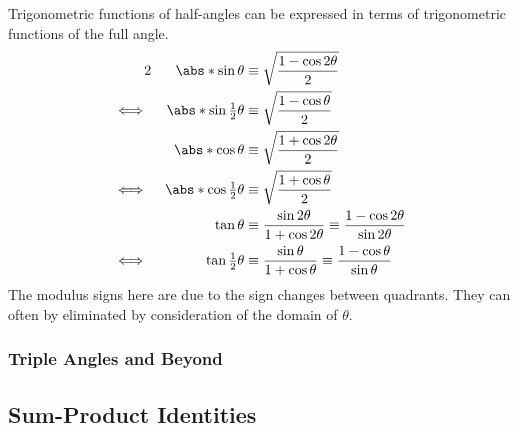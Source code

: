 \begin{theorem} \label{thm_trig_half_angle}
 Trigonometric functions of half-angles can be expressed in terms of
 trigonometric functions of the full angle.
 \begin{alignat*}2
  &&\abs*{\sin \theta} &\equiv
      \sqrt{\frac{1 - \cos 2 \theta} 2} \\
  \iff{}&& \abs*{\sin \tfrac 12 \theta} &\equiv
      \sqrt{\frac{1 - \cos \theta} 2} \\
  &&\abs*{\cos \theta} &\equiv
      \sqrt{\frac{1 + \cos 2 \theta} 2} \\
  \iff{}&& \abs*{\cos \tfrac 12 \theta} &\equiv
      \sqrt{\frac{1 + \cos \theta} 2} \\
  &&\tan \theta &\equiv
      \frac{\sin 2 \theta}{1 + \cos 2 \theta}
      \equiv \frac{1 - \cos 2 \theta}{\sin 2 \theta} \\
  \iff{}&& \tan \tfrac 12 \theta &\equiv
      \frac{\sin \theta}{1 + \cos \theta}
      \equiv \frac{1 - \cos \theta}{\sin \theta}
 \end{alignat*}
 The modulus signs here are due to the sign changes between quadrants. They can
 often by eliminated by consideration of the domain of \(\theta\).
\end{theorem}

\subsubsection{Triple Angles and Beyond}

\subsection{Sum-Product Identities} \label{sec_trig_sum_product}

